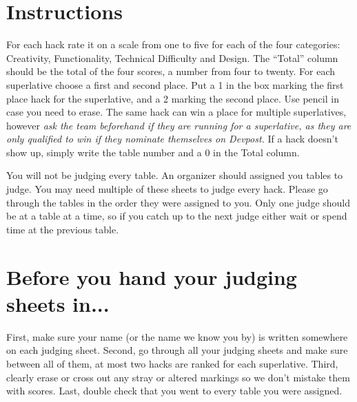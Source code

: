 \documentclass{article}
\begin{document}

\section{Instructions}

For each hack rate it on a scale from one to five for each of the four
categories: Creativity, Functionality, Technical Difficulty and Design. The
``Total'' column should be the total of the four scores, a number from four to
twenty. For each superlative choose a first and second place. Put a 1 in the box
marking the first place hack for the superlative, and a 2 marking the second
place. Use pencil in case you need to erase. The same hack can win a place for
multiple superlatives, however \textit{ask the team beforehand if they are
running for a superlative, as they are only qualified to win if they nominate
themselves on Devpost.} If a hack doesn't show up, simply write the table number
and a 0 in the Total column.

You will not be judging every table. An organizer should assigned you tables to
judge. You may need multiple of these sheets to judge every hack. Please go
through the tables in the order they were assigned to you. Only one judge should
be at a table at a time, so if you catch up to the next judge either wait or
spend time at the previous table.

\section{Before you hand your judging sheets in...}

First, make sure your name (or the name we know you by) is written somewhere on
each judging sheet. Second, go through all your judging sheets and make sure
between all of them, at most two hacks are ranked for each superlative. Third,
clearly erase or cross out any stray or altered markings so we don't mistake
them with scores. Last, double check that you went to every table you were
assigned.

\newcommand{\judgerow}{
  \parbox[][1cm]{0cm}{} &
    \parbox[c][1cm]{1cm}{\ } &
    \parbox[c][1cm]{1cm}{\ } &
    \parbox[c][1cm]{1cm}{\ } &
    \parbox[c][1cm]{1cm}{\ } &
    \parbox[c][1cm]{1cm}{\ } &
    \cellcolor{black} &
    \parbox[c][1cm]{1cm}{\ } &
    \parbox[c][1cm]{1cm}{\ } &
    \parbox[c][1cm]{1cm}{\ } &
    \parbox[c][1cm]{1cm}{\ }
}
\end{document}
